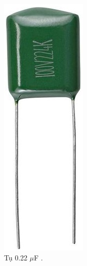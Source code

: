 \documentclass[a4paper,12pt,oneside]{article}
\begin{document}
\begin{enumerate}
\begin{itemize}
\begin{figure}[H]
\centering
\begin{center}
\includegraphics[scale=.4]{hinh/PPM/ppm_c22.jpg}
\end{center}
\caption{Tụ 0.22 $\mu$F \cite{dientuachau}.}
\end{figure}


\end{itemize}
\end{enumerate}
\end{document}
